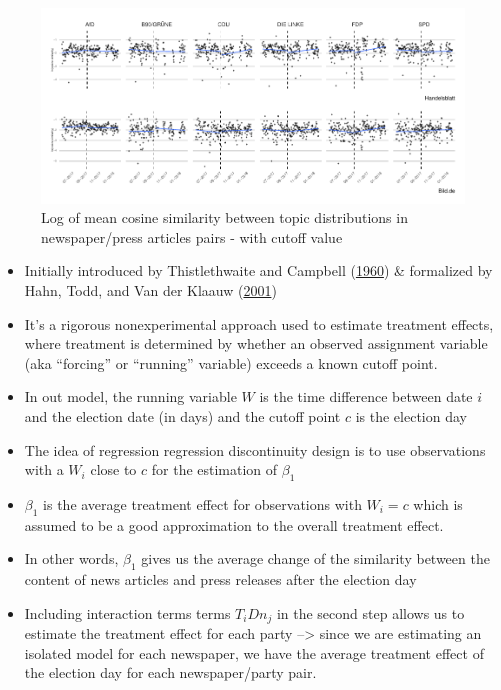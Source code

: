 \documentclass[
]{article}
\providecommand{\tightlist}{%
  \setlength{\itemsep}{0pt}\setlength{\parskip}{0pt}}
\begin{document}
\begin{figure}

{\centering \includegraphics[width=0.8\linewidth]{main_text_files/figure-latex/Daily mean cosine similarity - treatment-1} 

}

\caption{Log of mean cosine similarity between topic distributions in newspaper/press articles pairs - with cutoff value \label{fig:mean_cosine_sim_rd}}\label{fig:Daily mean cosine similarity - treatment}
\end{figure}

\begin{itemize}
\tightlist
\item
  Initially introduced by Thistlethwaite and Campbell
  (\protect\hyperlink{ref-thistlethwaite_regression-discontinuity_1960}{1960})
  \& formalized by Hahn, Todd, and Van der Klaauw
  (\protect\hyperlink{ref-hahn_identification_2001}{2001})
\item
  It's a rigorous nonexperimental approach used to estimate treatment
  effects, where treatment is determined by whether an observed
  assignment variable (aka ``forcing'' or ``running'' variable) exceeds
  a known cutoff point.
\item
  In out model, the running variable \(W\) is the time difference
  between date \(i\) and the election date (in days) and the cutoff
  point \(c\) is the election day
\item
  The idea of regression regression discontinuity design is to use
  observations with a \(W_i\) close to \(c\) for the estimation of
  \(\beta_1\)
\item
  \(\beta_1\) is the average treatment effect for observations with
  \(W_i = c\) which is assumed to be a good approximation to the overall
  treatment effect.
\item
  In other words, \(\beta_1\) gives us the average change of the
  similarity between the content of news articles and press releases
  after the election day
\item
  Including interaction terms terms \(T_iDn_{j}\) in the second step
  allows us to estimate the treatment effect for each party
  --\textgreater{} since we are estimating an isolated model for each
  newspaper, we have the average treatment effect of the election day
  for each newspaper/party pair.
\end{itemize}
\end{document}
